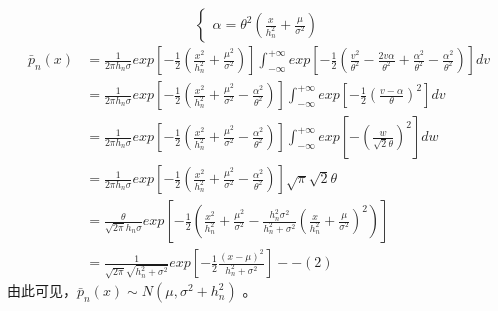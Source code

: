 \documentclass[a4paper,11pt,onecolumn,oneside,UTF8]{article}
\begin{document}
\begin{enumerate}
$$\begin{cases}
                  \alpha = \theta^2\left(\frac{x}{h_n^2}+\frac{\mu}{\sigma^2}\right)
              \end{cases}
          $$
          $$
              \begin{aligned}
                  \bar p_n\left(x\right) & = \frac{1}{2\pi h_n\sigma}exp\left[-\frac{1}{2}
                      \left(\frac{x^2}{h_n^2}+\frac{\mu^2}{\sigma^2}\right)\right]\int_{-\infty}^{+\infty}
                  exp\left[-\frac{1}{2}\left(\frac{v^2}{\theta^2}-\frac{2v\alpha}{\theta^2}
                  +\frac{\alpha^2}{\theta^2}-\frac{\alpha^2}{\theta^2}\right)\right]dv                       \\
                                         & = \frac{1}{2\pi h_n\sigma}exp\left[-\frac{1}{2}
                      \left(\frac{x^2}{h_n^2}+\frac{\mu^2}{\sigma^2}-\frac{\alpha^2}{\theta^2}
                      \right)\right]\int_{-\infty}^{+\infty}exp\left[-\frac{1}{2}
                  \left(\frac{v-\alpha}{\theta}\right)^2\right]dv                                            \\
                                         & = \frac{1}{2\pi h_n\sigma}exp\left[-\frac{1}{2}
                      \left(\frac{x^2}{h_n^2}+\frac{\mu^2}{\sigma^2}-\frac{\alpha^2}{\theta^2}
                      \right)\right]\int_{-\infty}^{+\infty}exp\left[-\left(\frac{w}{\sqrt{2}\theta}\right)^2
                  \right]dw                                                                                  \\
                                         & = \frac{1}{2\pi h_n\sigma}exp\left[-\frac{1}{2}
                      \left(\frac{x^2}{h_n^2}+\frac{\mu^2}{\sigma^2}-\frac{\alpha^2}{\theta^2}
                  \right)\right]\sqrt{\pi}\sqrt{2}\theta                                                     \\
                                         & = \frac{\theta}{\sqrt{2\pi} h_n\sigma}exp\left[-\frac{1}{2}
                      \left(\frac{x^2}{h_n^2}+\frac{\mu^2}{\sigma^2}-\frac{h_n^2\sigma^2}{h_n^2+\sigma^2}
                  \left(\frac{x}{h_n^2}+\frac{\mu}{\sigma^2}\right)^2\right)\right]                          \\
                                         & = \frac{1}{\sqrt{2\pi}\sqrt{h_n^2+\sigma^2}}exp\left[-\frac{1}{2}
                      \frac{\left(x-\mu\right)^2}{h_n^2+\sigma^2}\right]--(2)
              \end{aligned}
          $$
          由此可见，$\bar p_n\left(x\right)\sim N\left(\mu,\sigma^2+h_n^2\right)$ 。

\end{enumerate}
\end{document}
